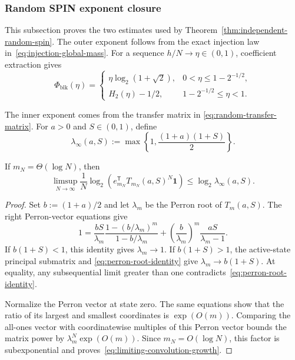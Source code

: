 \subsubsection{Random SPIN exponent closure}
\label{app:random-spin-exponents}

This subsection proves the two estimates used by
Theorem~\ref{thm:independent-random-spin}. The outer exponent follows from
the exact injection law in~\eqref{eq:injection-global-mass}. For a sequence
$h/N\to\eta\in(0,1)$, coefficient extraction gives
\begin{equation}
  \Phi_{\mathrm{blk}}(\eta)
  =
  \begin{cases}
    \eta\log_2(1+\sqrt2),
      &0<\eta\le1-2^{-1/2},\\[1mm]
    H_2(\eta)-1/2,
      &1-2^{-1/2}\le\eta<1.
  \end{cases}
  \label{eq:random-outer-linear-exponent}
\end{equation}

The inner exponent comes from the transfer matrix in
\eqref{eq:random-transfer-matrix}. For $a>0$ and $S\in(0,1)$, define
\[
  \lambda_\infty(a,S)
  :=
  \max\left\{1,\frac{(1+a)(1+S)}2\right\}.
\]

\begin{lemma}
\label{lem:limiting-convolution-growth}
If $m_N=\Theta(\log N)$, then
\begin{equation}
  \limsup_{N\to\infty}\frac1N\log_2
  \left(
    e_{m_N}^{\mathsf T}T_{m_N}(a,S)^N\boldsymbol 1
  \right)
  \le\log_2\lambda_\infty(a,S).
  \label{eq:limiting-convolution-growth}
\end{equation}
\end{lemma}

\begin{proof}
Set $b:=(1+a)/2$ and let $\lambda_m$ be the Perron root of
$T_m(a,S)$. The right Perron-vector equations give
\begin{equation}
  1
  =
  \frac{bS}{\lambda_m}
  \frac{1-(b/\lambda_m)^m}{1-b/\lambda_m}
  +
  \left(\frac b{\lambda_m}\right)^m
  \frac{aS}{\lambda_m-1}.
  \label{eq:perron-root-identity}
\end{equation}
If $b(1+S)<1$, this identity gives $\lambda_m\to1$. If
$b(1+S)>1$, the active-state principal submatrix and
\eqref{eq:perron-root-identity} give
$\lambda_m\to b(1+S)$. At equality, any subsequential limit greater than one
contradicts~\eqref{eq:perron-root-identity}.

Normalize the Perron vector at state zero. The same equations show that the
ratio of its largest and smallest coordinates is $\exp(O(m))$. Comparing the
all-ones vector with coordinatewise multiples of this Perron vector bounds the
matrix power by $\lambda_m^N\exp(O(m))$. Since $m_N=O(\log N)$, this factor is
subexponential and proves~\eqref{eq:limiting-convolution-growth}.
\end{proof}

